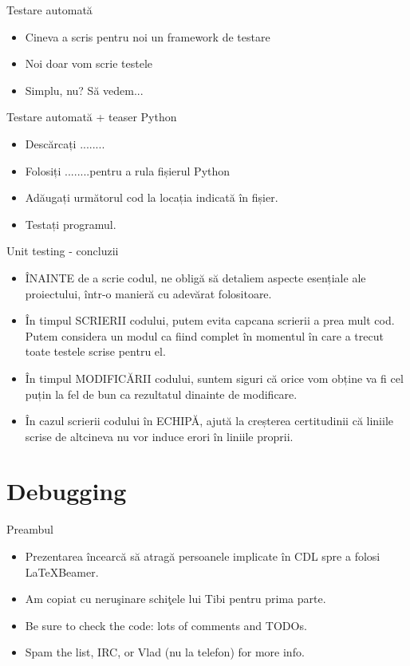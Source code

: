\documentclass{beamer}
\begin{document}
\begin{frame}{Testare automată}
\begin{itemize}
\item Cineva a scris pentru noi un framework de testare
\item \pause Noi doar vom scrie testele
\item \pause Simplu, nu? \pause Să vedem...
\end{itemize}
\end{frame}

\begin{frame}{Testare automată + teaser Python}
\begin{itemize}
\item Descărcați ........
\item Folosiți \linebreak ........\linebreak pentru a rula fișierul Python
\item \pause Adăugați următorul cod la locația indicată în fișier.
\item Testați programul.
\end{itemize}
\end{frame}

\begin{frame}{Unit testing - concluzii}
\begin{itemize}
\item ÎNAINTE de a scrie codul, ne obligă să detaliem aspecte esențiale ale proiectului, într-o manieră cu adevărat folositoare.
\item \pause În timpul SCRIERII codului, putem evita capcana scrierii a prea mult cod. \pause Putem considera un modul ca fiind complet în momentul în care a trecut toate testele scrise pentru el.
\item \pause În timpul MODIFICĂRII codului, suntem siguri că orice vom obține va fi cel puțin la fel de bun ca rezultatul dinainte de modificare.
\item \pause În cazul scrierii codului în ECHIPĂ, ajută la creșterea certitudinii că liniile scrise de altcineva nu vor induce erori în liniile proprii.
\end{itemize}
\end{frame}

\section{Debugging}
\frame{\tableofcontents[currentsection]}

\begin{frame}{Preambul}
\begin{itemize} %
\item Prezentarea încearcă să atragă persoanele implicate în CDL spre a folosi
\LaTeX Beamer.
\item Am copiat cu neruşinare schiţele lui Tibi pentru prima parte.
\item Be sure to check the code: lots of comments and TODOs.
\item Spam the list, IRC, or Vlad (nu la telefon) for more info.
\end{itemize}
\end{frame}
\end{document}
